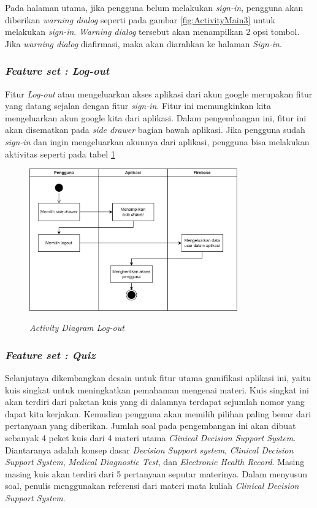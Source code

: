 Pada halaman utama, jika pengguna belum melakukan \textit{sign-in}, pengguna akan diberikan \textit{warning dialog} seperti pada gambar \ref*{fig:ActivityMain3} untuk melakukan \textit{sign-in}.
\textit{Warning dialog} tersebut akan menampilkan 2 opsi tombol. Jika \textit{warning dialog} diafirmasi, maka akan diarahkan ke halaman \textit{Sign-in}.
\subsubsection{\textit{Feature set : Log-out}}
Fitur \textit{Log-out} atau mengeluarkan akses aplikasi dari akun google merupakan fitur yang datang sejalan dengan fitur \textit{sign-in}.
Fitur ini memungkinkan kita mengeluarkan akun google kita dari aplikasi. Dalam pengembangan ini, fitur ini akan disematkan pada \textit{side drawer} bagian bawah aplikasi.
Jika pengguna sudah \textit{sign-in} dan ingin mengeluarkan akunnya dari aplikasi, pengguna bisa melakukan aktivitas seperti pada tabel \ref*{Fig:ActivityOut}
\begin{figure}[H]
	\centering
	\caption{\textit{Activity Diagram Log-out}}
	\includegraphics[width=0.8\textwidth]{contents/chapter-3/images/AD-signout.png}
	\label{Fig:ActivityOut}
\end{figure}
\subsubsection{\textit{Feature set : Quiz}}
Selanjutnya dikembangkan desain untuk fitur utama gamifikasi aplikasi ini, yaitu kuis singkat untuk meningkatkan pemahaman mengenai materi.
Kuis singkat ini akan terdiri dari paketan kuis yang di dalamnya terdapat sejumlah nomor yang dapat kita kerjakan. Kemudian pengguna akan memilih pilihan paling benar dari pertanyaan yang diberikan.
Jumlah soal pada pengembangan ini akan dibuat sebanyak 4 peket kuis dari 4 materi utama \textit{Clinical Decision Support System}. Diantaranya adalah konsep dasar \textit{Decision Support system}, \textit{Clinical Decision Support System}, \textit{Medical Diagnostic Test}, dan \textit{Electronic Health Record}.
Masing masing kuis akan terdiri dari 5 pertanyaan seputar materinya. Dalam menyusun soal, penulis menggunakan referensi dari materi mata kuliah \textit{Clinical Decision Support System}.

